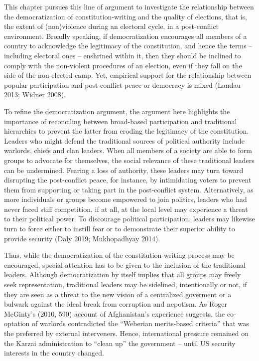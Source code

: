 \documentclass [11pt]{article}
\begin{document}
This chapter pursues this line of argument to investigate the relationship between the democratization of constitution-writing and the quality of elections, that is, the extent of (non)violence during an electoral cycle, in a post-conflict environment. Broadly speaking, if democratization encourages all members of a country to acknowledge the legitimacy of the constitution, and hence the terms -- including electoral ones -- enshrined within it, then they should be inclined to comply with the non-violent procedures of an election, even if they fall on the side of the non-elected camp. Yet, empirical support for the relationship between popular participation and post-conflict peace or democracy is mixed (Landau 2013; Widner 2008).

To refine the democratization argument, the argument here highlights the importance of reconciling between broad-based participation and traditional hierarchies to prevent the latter from eroding the legitimacy of the constitution. Leaders who might defend the traditional sources of political authority include warlords, chiefs and clan leaders. When all members of a society are able to form groups to advocate for themselves, the social relevance of these traditional leaders can be undermined. Fearing a loss of authority, these leaders may turn toward disrupting the post-conflict peace, for instance, by intimidating voters to prevent them from supporting or taking part in the post-conflict system. Alternatively, as more individuals or groups become empowered to join politics, leaders who had never faced stiff competition, if at all, at the local level may experience a threat to their political power. To discourage political participation, leaders may likewise turn to force either to instill fear or to demonstrate their superior ability to provide security (Daly 2019; Mukhopadhyay 2014).

Thus, while the democratization of the constitution-writing process may be encouraged, special attention has to be given to the inclusion of the traditional leaders. Although democratization by itself implies that all groups may freely seek representation, traditional leaders may be sidelined, intentionally or not, if they are seen as a threat to the new vision of a centralized goverment or a bulwark against the ideal break from corruption and nepotism. As Roger McGinty's (2010, 590) account of Afghanistan's experience suggests, the co-optation of warlords contradicted the ``Weberian merits-based criteria'' that was the preferred by external interveners. Hence, international pressure remained on the Karzai administration to ``clean up'' the government -- until US security interests in the country changed.
\end{document}
